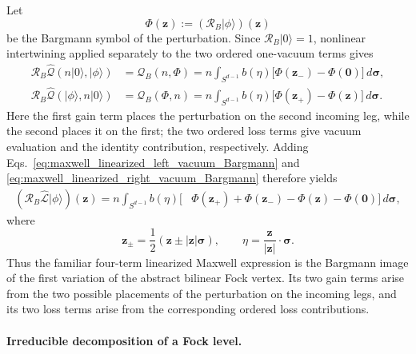 \documentclass[11pt,oneside]{article}
\numberwithin{equation}{section}
\theoremstyle{definition}
\begin{document}
Let
\begin{equation}
\Phi(\bm z):=(\mathcal R_B|\phi\rangle)(\bm z)
\end{equation}
be the Bargmann symbol of the perturbation.  Since $\mathcal R_B|0\rangle=1$, nonlinear intertwining applied separately to the two ordered one-vacuum terms gives
\begin{align}
\mathcal R_B\widehat{\mathcal Q}(n|0\rangle,|\phi\rangle)
&=
\mathcal Q_B(n,\Phi)
=
n\int_{S^{d-1}}b(\eta)
\bigl[\Phi(\bm z_-)-\Phi(\bm0)\bigr] \,d\bm\sigma,
\label{eq:maxwell_linearized_left_vacuum_Bargmann}
\\
\mathcal R_B\widehat{\mathcal Q}(|\phi\rangle,n|0\rangle)
&=
\mathcal Q_B(\Phi,n)
=
n\int_{S^{d-1}}b(\eta)
\bigl[\Phi(\bm z_+)-\Phi(\bm z)\bigr] \,d\bm\sigma.
\label{eq:maxwell_linearized_right_vacuum_Bargmann}
\end{align}
Here the first gain term places the perturbation on the second incoming leg, while the second places it on the first; the two ordered loss terms give vacuum evaluation and the identity contribution, respectively.  Adding Eqs.~\eqref{eq:maxwell_linearized_left_vacuum_Bargmann} and \eqref{eq:maxwell_linearized_right_vacuum_Bargmann} therefore yields
\begin{equation}
\begin{aligned}
(\mathcal R_B\widehat{\mathcal L}|\phi\rangle)(\bm z)
=
n\int_{S^{d-1}}b(\eta)
\Big[
&
\Phi(\bm z_+)
+
\Phi(\bm z_-)
-\Phi(\bm z)
-\Phi(\bm0)
\Big] \,d\bm\sigma ,
\end{aligned}
\label{eq:maxwell_linearized_Bargmann_action}
\end{equation}
where
\begin{equation}
\bm z_\pm
=
\frac12
\left(
\bm z\pm|\bm z|\bm\sigma
\right),
\qquad
\eta
=
\frac{\bm z}{|\bm z|}\cdot\bm\sigma .
\end{equation}
Thus the familiar four-term linearized Maxwell expression is the Bargmann image of the first variation of the abstract bilinear Fock vertex.  Its two gain terms arise from the two possible placements of the perturbation on the incoming legs, and its two loss terms arise from the corresponding ordered loss contributions.

\paragraph{Irreducible decomposition of a Fock level.}
\end{document}
